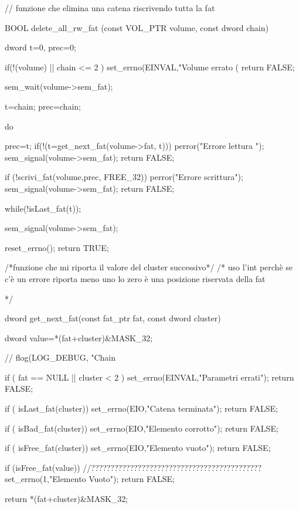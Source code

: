 // funzione che elimina una catena riscrivendo tutta la fat 

BOOL delete_all_rw_fat (const VOL_PTR volume, const dword chain) { 
  
  dword t=0, prec=0; 
  
  
  if(!(volume) || chain <= 2 ) {
    set_errno(EINVAL,"Volume errato (%
    return FALSE; 
  }
  
  sem_wait(volume->sem_fat); 
  
  t=chain; 
  prec=chain; 
  
    do {
	prec=t; 
	if(!(t=get_next_fat(volume->fat, t))) {
	  perror("Errore lettura ");
	  sem_signal(volume->sem_fat); 
	  return FALSE; 
	}
	
	if (!scrivi_fat(volume,prec, FREE_32)) {
	  perror("Errore scrittura");
	  sem_signal(volume->sem_fat); 
	  return FALSE;  
	}
    } while(!isLast_fat(t)); 
    
   sem_signal(volume->sem_fat); 
  
    
  reset_errno(); 
  return TRUE; 
  
}



/*funzione che mi riporta il valore del cluster successivo*/
/* uso l'int perchè se c'è un errore riporta meno uno  
  lo zero è una posizione riservata della fat 
  
 */ 

dword get_next_fat(const fat_ptr fat, const dword cluster) {
  
  dword value=*(fat+cluster)&MASK_32; 
  
  
 // flog(LOG_DEBUG, "Chain %
  
  if ( fat == NULL || cluster < 2 ) { 
     set_errno(EINVAL,"Parametri errati"); 
     return FALSE;  
  }
  
  if ( isLast_fat(cluster)) {
      set_errno(EIO,"Catena terminata"); 
      return FALSE; 
  }
 
  if ( isBad_fat(cluster)) {
     set_errno(EIO,"Elemento corrotto");
     return FALSE; 
  }
  
  if ( isFree_fat(cluster)) {
     set_errno(EIO,"Elemento vuoto");
     return FALSE; 
  }
  
  
  if (isFree_fat(value)) {  //????????????????????????????????????????????
      set_errno(1,"Elemento Vuoto");
      return FALSE; 
  } 
   
  
  return *(fat+cluster)&MASK_32;
  
}



